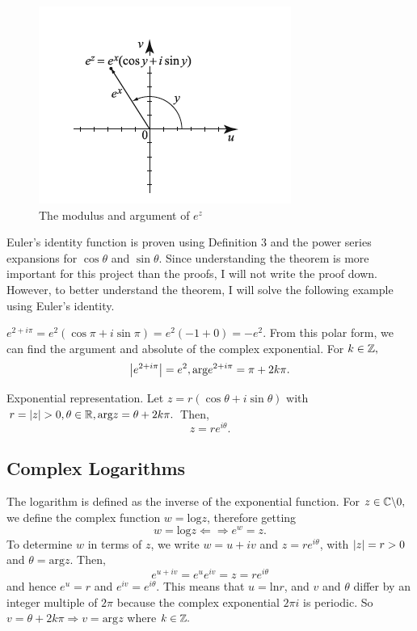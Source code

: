 \documentclass[11pt,reqno,oneside,a4paper]{article}
\begin{document}
\begin{figure}
    \centering
    \includegraphics[width=0.8\linewidth]{gfx/complex exp vis.png}
    \caption{The modulus and argument of $e^z$}
    \label{fig:complex exp vis}
\end{figure}


Euler's identity function is proven using Definition 3 and the power series expansions for $\cos\theta$ and $\sin\theta.$ 
Since understanding the theorem is more important for this project than the proofs, I will not write the proof down. 
However, to better understand the theorem, I will solve the following example using Euler's identity.

\begin{eg}
$e^{2+i\pi} =  e^2(\cos\pi + i\sin\pi) =e^2(-1+0) = -e^2.$ 
From this polar form, we can find the argument and absolute of the complex exponential. For $k\in\mathbb Z,$
$$\left\lvert e^{2+i\pi}\right\rvert = e^2, \text{arg}e^{2+i\pi} = \pi + 2k\pi.$$
\end{eg}

\begin{prop}{Exponential representation.}
Let $z = r(\cos\theta + i\sin\theta)$ with $r=\left\lvert z\right\rvert > 0, \theta \in \mathbb R, \text{arg}z = \theta+2k\pi.$ 
Then, $$z = re^{i\theta}.$$
\end{prop}




\subsection{Complex Logarithms}
The logarithm is defined as the inverse of the exponential function. 
For $z\in \mathbb C \backslash {0},$ we define the complex function $w=\text{log} z$, therefore getting $$w=\text{log}z \Leftarrow \Rightarrow e^w = z.$$
To determine $w$ in terms of $z$, we write $w=u+iv$ and $z=re^{i\theta}$, with $\left\lvert z\right\rvert = r > 0$ and $ \theta = \text{arg}z.$ 
Then, $$e^{u+iv} = e^ue^{iv} = z = re^{i\theta}$$ and hence $e^u = r $ and $e^{iv} = e^{i\theta}.$
This means that $u = \text{ln}r$, and $v$ and $\theta$ differ by an integer multiple of $2\pi$ because the complex exponential $2\pi i$ is periodic. 
So $v = \theta + 2k\pi \Rightarrow v = \text{arg}z$ where $k\in\mathbb Z.$
\end{document}
